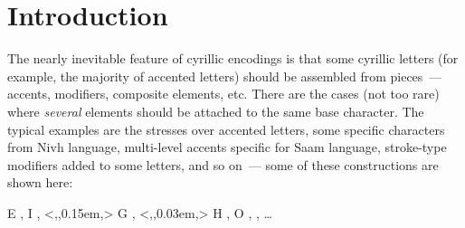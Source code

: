 \section{Introduction\label{S-Intro}}

The nearly inevitable feature of cyrillic encodings is that some cyrillic
letters (for example, the majority of accented letters) should be assembled
from pieces~--- accents, modifiers, composite elements, etc.
There are the cases (not too rare) where {\em several} elements should be
attached to the same base character. The typical examples are the stresses
over accented letters, some specific characters from Nivh language,
multi-level accents specific for Saam language, stroke-type modifiers
added to some letters, and so on~--- some of these constructions
are shown here:
\begin{center}
{\cmfont
           {%
                     {\cyrfont E}%
           }%
},\qquad
{\cmfont
           {%
                     {\cyrfont I}%
           }%
},\qquad
{\cmfont
       {%
               {\makeaccent[Cs]<,,0.15em,>{\aboxrule{0.3em}}%
                           {\cyrfont G}%
               }%
       }%
},\qquad
{\cmfont
           {\makeaccent[Cs]<,,0.03em,>{\aboxrule{0.4em}}%
                       {\cyrfont H}%
           }%
},\qquad
{\cmfont
           {%
                     {\cyrfont O}%
           }%
},\qquad
{\cmfont
},\qquad
\dots
\end{center}

